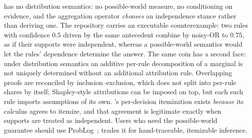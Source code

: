 \pla{} has no distribution semantics: no possible-world measure, no
conditioning on evidence, and the aggregation operator \emph{chooses} an
independence stance rather than deriving one. The repository carries an
executable counterexample: two rules with confidence $0.5$ driven by the
same antecedent combine by noisy-OR to $0.75$, as if their supports were
independent, whereas a possible-world semantics would let the rules'
dependence determine the answer. The same coin has a second face:
under distribution semantics an additive per-rule decomposition of a
marginal is not uniquely determined without an additional attribution
rule. Overlapping proofs are reconciled by inclusion--exclusion, which
does not split into per-rule shares by itself; Shapley-style
attributions can be imposed on top, but each such rule imports
assumptions of its own.
\pla{}'s per-decision itemization exists \emph{because} its calculus
agrees to itemize, and that agreement is legitimate exactly when
supports are treated as independent. Users who need the
possible-world guarantee should use ProbLog~\cite{deraedt2007};
\pla{} trades it for hand-traceable, itemizable inference.
